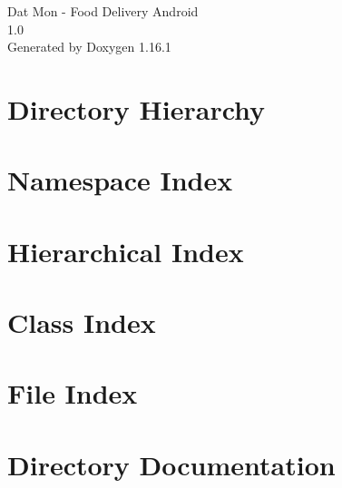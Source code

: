 \documentclass[twoside]{book}
\newcommand{\+}{\discretionary{\mbox{\scriptsize$\hookleftarrow$}}{}{}}
\newcommand{\clearemptydoublepage}{%
    \newpage{\pagestyle{empty}\cleardoublepage}%
  }
\begin{document}
  \raggedbottom
    \hypersetup{pageanchor=false,
                bookmarksnumbered=true,
                pdfencoding=unicode
               }
  \begin{titlepage}
  \vspace*{7cm}
  \begin{center}%
  {\Large Dat Mon -\/ Food Delivery Android}\\
  [1ex]\large 1.\+0 \\
  \vspace*{1cm}
  {\large Generated by Doxygen 1.16.1}\\
  \end{center}
  \end{titlepage}
  \clearemptydoublepage
  \tableofcontents
  \clearemptydoublepage
  \hypersetup{pageanchor=true}
\chapter{Directory Hierarchy}

\chapter{Namespace Index}

\chapter{Hierarchical Index}

\chapter{Class Index}

\chapter{File Index}

\chapter{Directory Documentation}












\end{document}
